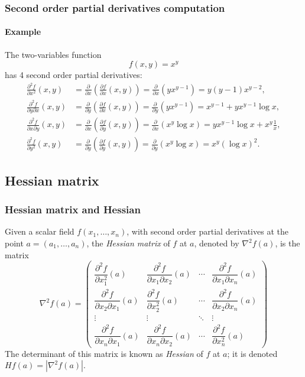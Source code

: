 \begin{frame}
\frametitle{Second order partial derivatives computation}
\framesubtitle{Example}
The two-variables function 
\[f(x,y)=x^y\]
has 4 second order partial derivatives:
\begin{align*}
\frac{\partial^2 f}{\partial x^2}(x,y) &=
\frac{\partial}{\partial x}\left(\frac{\partial f}{\partial x}(x,y)\right) =
\frac{\partial}{\partial x}\left(yx^{y-1}\right) =
y(y-1)x^{y-2},\\
\frac{\partial^2 f}{\partial y \partial x}(x,y) &=
\frac{\partial}{\partial y}\left(\frac{\partial f}{\partial x}(x,y)\right) =
\frac{\partial}{\partial y}\left(yx^{y-1}\right) =
x^{y-1}+yx^{y-1}\log x,\\
\frac{\partial^2 f}{\partial x \partial y}(x,y) &=
\frac{\partial}{\partial x}\left(\frac{\partial f}{\partial y}(x,y)\right) =
\frac{\partial}{\partial x}\left(x^y\log x \right) =
yx^{y-1}\log x+x^y\frac{1}{x},\\
\frac{\partial^2 f}{\partial y^2}(x,y) &=
\frac{\partial}{\partial y}\left(\frac{\partial f}{\partial y}(x,y)\right) =
\frac{\partial}{\partial y}\left(x^y\log x \right) =
x^y(\log x)^2.
\end{align*}
\end{frame}



\subsection{Hessian matrix}
\begin{frame}
\frametitle{Hessian matrix and Hessian}
\begin{definition}
Given a scalar field $f(x_1,\ldots,x_n)$, with second order partial derivatives at the point $a=(a_1,\ldots,a_n)$, the \emph{Hessian matrix} of $f$ at $a$, denoted by $\nabla^2f(a)$, is the matrix 
\[
\nabla^2f(a)=\left(
\begin{array}{cccc}
\dfrac{\partial^2 f}{\partial x_1^2}(a) &
\dfrac{\partial^2 f}{\partial x_1 \partial x_2}(a) &
\cdots &
\dfrac{\partial^2 f}{\partial x_1 \partial x_n}(a)\\
\dfrac{\partial^2 f}{\partial x_2 \partial x_1}(a) &
\dfrac{\partial^2 f}{\partial x_2^2}(a) &
\cdots &
\dfrac{\partial^2 f}{\partial x_2 \partial x_n}(a)\\
\vdots & \vdots & \ddots & \vdots \\
\dfrac{\partial^2 f}{\partial x_n \partial x_1}(a) &
\dfrac{\partial^2 f}{\partial x_n \partial x_2}(a) &
\cdots &
\dfrac{\partial^2 f}{\partial x_n^2}(a)
\end{array}
\right)
\]
The determinant of this matrix is known as \emph{Hessian} of $f$ at $a$; it is denoted $Hf(a)=|\nabla^2f(a)|$.
\end{definition}
\end{frame}


